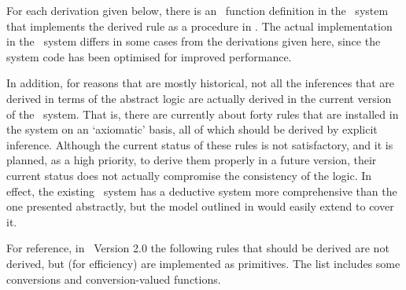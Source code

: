 For each derivation given below, there is an \ML\ function definition
in the \HOL\ system that implements the derived rule as a procedure in
\ML. The actual implementation in the \HOL\ system differs in some
cases from the derivations given here, since the system code has been
optimised for improved performance.

In addition, for reasons that are mostly historical, not all the
inferences that are derived in terms of the abstract logic are
actually derived in the current version of the \HOL\ system.  That is,
there are currently about forty rules that are installed in the system
on an `axiomatic' basis, all of which should be derived by explicit
inference.  Although the current status of these rules is not
satisfactory, and it is planned, as a high priority, to derive them
properly in a future version, their current status does not actually
compromise the consistency of the logic.  In effect, the existing
\HOL\ system has a deductive system more comprehensive than the one
presented abstractly, but the model outlined in \LOGIC{} would easily
extend to cover it.%
%

For reference, in \HOL\ Version 2.0 the following rules that should be
derived
%
%
are not derived, but (for efficiency) are implemented as
primitives. The list includes some conversions and conversion-valued
functions. %
\vfill \newpage

